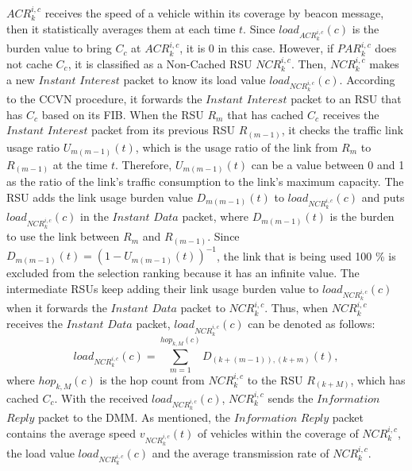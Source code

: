 \documentclass{ieeeaccess}
\begin{document}
$ACR^{i,c}_{k}$ receives the speed of a vehicle within its coverage by beacon message, then it statistically averages them at each time $t$.
Since $load_{ACR^{i,c}_{k}}(c)$ is the burden value to bring $C_{c}$ at $ACR^{i,c}_{k}$, it is 0 in this case.
However, if $PAR^{i,c}_{k}$ does not cache $C_{c}$, it is classified as a Non-Cached RSU $NCR^{i,c}_{k}$.
Then, $NCR^{i,c}_{k}$ makes a new $Instant$ $Interest$ packet to know its load value $load_{NCR^{i,c}_{k}}(c)$.
According to the CCVN procedure, it forwards the $Instant$ $Interest$ packet to an RSU that has $C_{c}$ based on its FIB.
When the RSU $R_{m}$ that has cached $C_{c}$ receives the $Instant$ $Interest$ packet from its previous RSU $R_{(m-1)}$, it checks the traffic link usage ratio $U_{m(m-1)}(t)$, which is the usage ratio of the link from $R_{m}$ to $R_{(m-1)}$ at the time $t$.
Therefore, $U_{m(m-1)}(t)$ can be a value between 0 and 1 as the ratio of the link's traffic consumption to the link's maximum capacity.
The RSU adds the link usage burden value $D_{m(m-1)}(t)$ to $load_{NCR^{i,c}_{k}}(c)$ and puts $load_{NCR^{i,c}_{k}}(c)$ in the $Instant$ $Data$ packet, where $D_{m(m-1)}(t)$ is the burden to use the link between $R_{m}$ and $R_{(m-1)}$.
Since $D_{m(m-1)}(t) = (1-U_{m(m-1)}(t))^{-1}$, the link that is being used 100 \% is excluded from the selection ranking because it has an infinite value.
The intermediate RSUs keep adding their link usage burden value to $load_{NCR^{i,c}_{k}}(c)$ when it forwards the $Instant$ $Data$ packet to $NCR^{i,c}_{k}$.
Thus, when $NCR^{i,c}_{k}$ receives the $Instant$ $Data$ packet, $load_{NCR^{i,c}_{k}}(c)$ can be denoted as follows:
\begin{equation}
    load_{NCR^{i,c}_{k}}(c) = \sum_{m=1}^{hop_{k,M}(c)} D_{(k+(m-1)), (k+m)}(t),
\end{equation}
where $hop_{k,M}(c)$ is the hop count from $NCR^{i,c}_{k}$ to the RSU $R_{(k+M)}$, which has cached $C_{c}$.
With the received $load_{NCR^{i,c}_{k}}(c)$, $NCR^{i,c}_{k}$ sends the $Information$ $Reply$ packet to the DMM.
As mentioned, the $Information$ $Reply$ packet contains the average speed $v_{NCR^{i,c}_{k}}(t)$ of vehicles within the coverage of $NCR^{i,c}_{k}$, the load value $load_{NCR^{i,c}_{k}}(c)$ and the average transmission rate of $NCR^{i,c}_{k}$.
\end{document}
